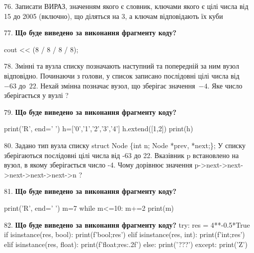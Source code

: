 \documentclass[11pt]{article}
\begin{document}
76. 
Записати ВИРАЗ, значенням якого є словник, ключами якого є цілі числа від 15 до 2005 (включно), що діляться на 3, а ключам відповідають їх куби \par\vspace{5mm}

77. \textbf{Що буде виведено за виконання фрагменту коду?}

cout << (8 / 8 / 8 / 8);
\par\vspace{5mm}

78. 
Змінні  та  вузла списку позначають наступний та попередній за ним вузол відповідно. Починаючи з голови, у список записано послідовні цілі числа від~$-63$ до~$22$. Нехай змінна  позначає вузол, що зберігає значення~$-4$.
Яке число зберігається у вузлі  ?
\par\vspace{5mm}

79. \textbf{Що буде виведено за виконання фрагменту коду?}

print('R', end=' ')
h=['0','1','2','3','4']
h.extend([1,2])
print(h)

\par\vspace{5mm}

80. 
Задано тип вузла списку
struct Node \{int n; Node *prev, *next;\};
У списку зберігаються послідовні цілі числа від -63 до 22. Вказівник p встановлено на вузол, в якому зберігається число -4.
Чому дорівнює значення p->next->next->next->next->next->n ?\par\vspace{5mm}

81. \textbf{Що буде виведено за виконання фрагменту коду?}

print('R', end=' ')
m=7
while m<=10:
    m+=2
print(m)

\par\vspace{5mm}

82. \textbf{Що буде виведено за виконання фрагменту коду?}
try:
    res = 4**-0.5*True
    if isinstance(res, bool):
        print(f'bool;{res}')
    elif isinstance(res, int):
        print(f'int;{res}')
    elif isinstance(res, float):
        print(f'float;{res:.2f}')
    else:
        print('???')
except:
    print('Z')
\par\vspace{5mm}
\end{document}
